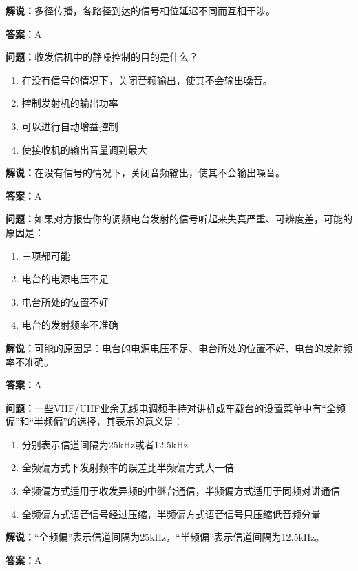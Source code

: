 \documentclass[UTF8]{ctexbook}
\begin{document}
\textbf{解说：}多径传播，各路径到达的信号相位延迟不同而互相干涉。%

\textbf{答案：}A

\textbf{问题：}收发信机中的静噪控制的目的是什么？

\begin{enumerate}[label=\Alph*), leftmargin=3em]
  \item 在没有信号的情况下，关闭音频输出，使其不会输出噪音。
  \item 控制发射机的输出功率
  \item 可以进行自动增益控制
  \item 使接收机的输出音量调到最大
\end{enumerate}

\textbf{解说：}在没有信号的情况下，关闭音频输出，使其不会输出噪音。%

\textbf{答案：}A

\textbf{问题：}如果对方报告你的调频电台发射的信号听起来失真严重、可辨度差，可能的原因是：

\begin{enumerate}[label=\Alph*), leftmargin=3em]
  \item 三项都可能
  \item 电台的电源电压不足
  \item 电台所处的位置不好
  \item 电台的发射频率不准确
\end{enumerate}

\textbf{解说：}可能的原因是：电台的电源电压不足、电台所处的位置不好、电台的发射频率不准确。%

\textbf{答案：}A

\textbf{问题：}一些VHF/UHF业余无线电调频手持对讲机或车载台的设置菜单中有“全频偏”和“半频偏”的选择，其表示的意义是：

\begin{enumerate}[label=\Alph*), leftmargin=3em]
  \item 分别表示信道间隔为25kHz或者12.5kHz
  \item 全频偏方式下发射频率的误差比半频偏方式大一倍
  \item 全频偏方式适用于收发异频的中继台通信，半频偏方式适用于同频对讲通信
  \item 全频偏方式语音信号经过压缩，半频偏方式语音信号只压缩低音频分量
\end{enumerate}

\textbf{解说：}“全频偏”表示信道间隔为25kHz，“半频偏”表示信道间隔为12.5kHz。%

\textbf{答案：}A
\end{document}
